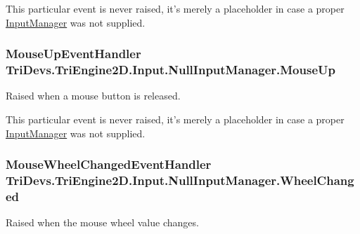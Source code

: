 This particular event is never raised, it's merely a placeholder in case a proper \hyperlink{class_tri_devs_1_1_tri_engine2_d_1_1_input_1_1_input_manager}{Input\-Manager} was not supplied. \hypertarget{class_tri_devs_1_1_tri_engine2_d_1_1_input_1_1_null_input_manager_a2c8666789b72d24586758d5fa8f91ec0}{
\subsubsection[{Mouse\-Up}]{\setlength{\rightskip}{0pt plus 5cm}Mouse\-Up\-Event\-Handler Tri\-Devs.\-Tri\-Engine2\-D.\-Input.\-Null\-Input\-Manager.\-Mouse\-Up}}\label{class_tri_devs_1_1_tri_engine2_d_1_1_input_1_1_null_input_manager_a2c8666789b72d24586758d5fa8f91ec0}


Raised when a mouse button is released. 

This particular event is never raised, it's merely a placeholder in case a proper \hyperlink{class_tri_devs_1_1_tri_engine2_d_1_1_input_1_1_input_manager}{Input\-Manager} was not supplied. \hypertarget{class_tri_devs_1_1_tri_engine2_d_1_1_input_1_1_null_input_manager_a915dd2af6bdab8bd9dbb9d3ef1debc6c}{
\subsubsection[{Wheel\-Changed}]{\setlength{\rightskip}{0pt plus 5cm}Mouse\-Wheel\-Changed\-Event\-Handler Tri\-Devs.\-Tri\-Engine2\-D.\-Input.\-Null\-Input\-Manager.\-Wheel\-Changed}}\label{class_tri_devs_1_1_tri_engine2_d_1_1_input_1_1_null_input_manager_a915dd2af6bdab8bd9dbb9d3ef1debc6c}


Raised when the mouse wheel value changes. 

